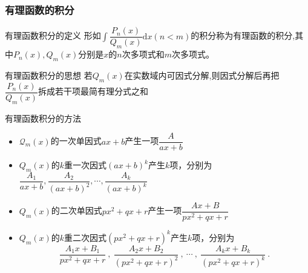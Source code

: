 \documentclass[8pt a4paper, oneside, UTF8]{ctexbook}
\begin{document}
\begin{sloppypar}
    \subsubsection{有理函数的积分}
    \begin{defn}{有理函数积分的定义}{}
        形如$\int\dfrac{P_n(x)}{Q_m(x)}\mathrm{d}x(n<m)$的积分称为有理函数的积分,其中$P_n(x),Q_m(x)$分别是$x$的$n$次多项式和$m$次多项式。
    \end{defn}
    \begin{defn}{有理函数积分的思想}{}
        若$Q_m(x)$在实数域内可因式分解,则因式分解后再把$\dfrac{P_n(x)}{Q_m(x)}$拆成若干项最简有理分式之和
    \end{defn}
    \begin{defn}{有理函数积分的方法}{}
        \begin{itemize}
            \item ${\mathcal Q}_{m}(x)$的一次单因式$ax+b$产生一项$\dfrac A{ax+b}$
            \item $Q_{m}(x)$的$k$重一次因式$(ax+b)^k$产生$k$项，分别为$\dfrac {A_1}{ax+b},\dfrac{A_{2}}{(ax+b)^{2}},\cdots,\dfrac{A_{k}}{(ax+b)^{k}}$
            \item $Q_{m}(x)$的二次单因式$px^2+qx+r$产生一项$\dfrac{Ax+B}{px^2+qx+r}$
            \item $Q_{m}(x)$的$k$重二次因式$(px^2+qx+r)^k$产生$k$项，分别为
                  $$\dfrac{A_1x+B_1}{px^2+qx+r}\:,\:\dfrac{A_2x+B_2}{(px^2+qx+r)^2}\:,\:\cdots\:,\:\dfrac{A_kx+B_k}{(px^2+qx+r)^k}\:.$$
        \end{itemize}
    \end{defn}
    \ifx\allfiles\undefined
\end{sloppypar}
\end{document}
